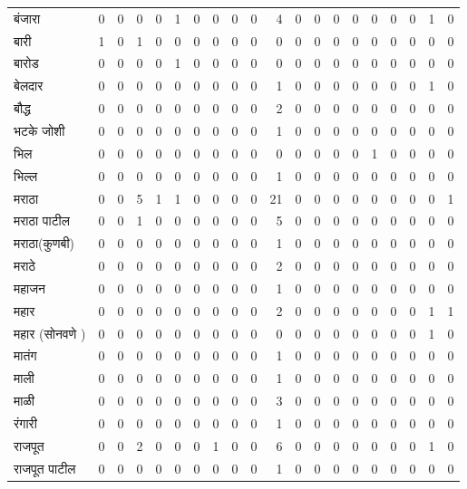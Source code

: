 \documentclass{article}
\begin{document}
\begin{table}
\begin{tabular}{lrrrrrrrrrrrrrrrrrrr}
बंजारा & 0 & 0 & 0 & 0 & 1 & 0 & 0 & 0 & 0 & 4 & 0 & 0 & 0 & 0 & 0 & 0 & 0 & 1 & 0 \\
बारी & 1 & 0 & 1 & 0 & 0 & 0 & 0 & 0 & 0 & 0 & 0 & 0 & 0 & 0 & 0 & 0 & 0 & 0 & 0 \\
बारोड & 0 & 0 & 0 & 0 & 1 & 0 & 0 & 0 & 0 & 0 & 0 & 0 & 0 & 0 & 0 & 0 & 0 & 0 & 0 \\
बेलदार & 0 & 0 & 0 & 0 & 0 & 0 & 0 & 0 & 0 & 1 & 0 & 0 & 0 & 0 & 0 & 0 & 0 & 1 & 0 \\
बौद्ध & 0 & 0 & 0 & 0 & 0 & 0 & 0 & 0 & 0 & 2 & 0 & 0 & 0 & 0 & 0 & 0 & 0 & 0 & 0 \\
भटके जोशी & 0 & 0 & 0 & 0 & 0 & 0 & 0 & 0 & 0 & 1 & 0 & 0 & 0 & 0 & 0 & 0 & 0 & 0 & 0 \\
भिल & 0 & 0 & 0 & 0 & 0 & 0 & 0 & 0 & 0 & 0 & 0 & 0 & 0 & 0 & 1 & 0 & 0 & 0 & 0 \\
भिल्ल & 0 & 0 & 0 & 0 & 0 & 0 & 0 & 0 & 0 & 1 & 0 & 0 & 0 & 0 & 0 & 0 & 0 & 0 & 0 \\
मराठा & 0 & 0 & 5 & 1 & 1 & 0 & 0 & 0 & 0 & 21 & 0 & 0 & 0 & 0 & 0 & 0 & 0 & 0 & 1 \\
मराठा पाटील & 0 & 0 & 1 & 0 & 0 & 0 & 0 & 0 & 0 & 5 & 0 & 0 & 0 & 0 & 0 & 0 & 0 & 0 & 0 \\
मराठा(कुणबी) & 0 & 0 & 0 & 0 & 0 & 0 & 0 & 0 & 0 & 1 & 0 & 0 & 0 & 0 & 0 & 0 & 0 & 0 & 0 \\
मराठे & 0 & 0 & 0 & 0 & 0 & 0 & 0 & 0 & 0 & 2 & 0 & 0 & 0 & 0 & 0 & 0 & 0 & 0 & 0 \\
महाजन & 0 & 0 & 0 & 0 & 0 & 0 & 0 & 0 & 0 & 1 & 0 & 0 & 0 & 0 & 0 & 0 & 0 & 0 & 0 \\
महार & 0 & 0 & 0 & 0 & 0 & 0 & 0 & 0 & 0 & 2 & 0 & 0 & 0 & 0 & 0 & 0 & 0 & 1 & 1 \\
महार (सोनवणे ) & 0 & 0 & 0 & 0 & 0 & 0 & 0 & 0 & 0 & 0 & 0 & 0 & 0 & 0 & 0 & 0 & 0 & 1 & 0 \\
मातंग & 0 & 0 & 0 & 0 & 0 & 0 & 0 & 0 & 0 & 1 & 0 & 0 & 0 & 0 & 0 & 0 & 0 & 0 & 0 \\
माली & 0 & 0 & 0 & 0 & 0 & 0 & 0 & 0 & 0 & 1 & 0 & 0 & 0 & 0 & 0 & 0 & 0 & 0 & 0 \\
माळी & 0 & 0 & 0 & 0 & 0 & 0 & 0 & 0 & 0 & 3 & 0 & 0 & 0 & 0 & 0 & 0 & 0 & 0 & 0 \\
रंगारी & 0 & 0 & 0 & 0 & 0 & 0 & 0 & 0 & 0 & 1 & 0 & 0 & 0 & 0 & 0 & 0 & 0 & 0 & 0 \\
राजपूत & 0 & 0 & 2 & 0 & 0 & 0 & 1 & 0 & 0 & 6 & 0 & 0 & 0 & 0 & 0 & 0 & 0 & 1 & 0 \\
राजपूत पाटील & 0 & 0 & 0 & 0 & 0 & 0 & 0 & 0 & 0 & 1 & 0 & 0 & 0 & 0 & 0 & 0 & 0 & 0 & 0 \\

\end{tabular}
\end{table}
\end{document}

